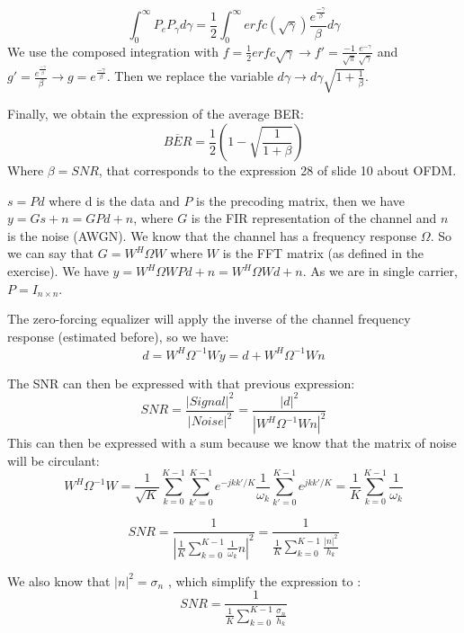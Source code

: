 
\begin{solution}
	$$\int_0^\infty P_e P_\gamma d\gamma = \frac{1}{2} \int_0^\infty erfc(\sqrt{\gamma}) \frac{e^{\frac{-\gamma}{\beta}}}{\beta} d\gamma$$
	We use the composed integration with $f = \frac{1}{2}erfc{\sqrt{\gamma}} \rightarrow f' = \frac{-1}{\sqrt{\pi}}\frac{e^{-\gamma}}{\sqrt{\gamma}}$ and $g' = \frac{e^{\frac{-\gamma}{\beta}}}{\beta} \rightarrow g = e^{\frac{-\gamma}{\beta}}$.
	Then we replace the variable $d\gamma \rightarrow d\gamma \sqrt{1 + \frac{1}{\beta}}$. 
	
	Finally, we obtain the expression of the average BER:
	$$\overline{BER} = \frac{1}{2}(1 - \sqrt{\frac{1}{1 + \beta}})$$
	Where $\beta = SNR$, that corresponds to the expression 28 of slide 10 about OFDM.
\end{solution}

\begin{solution}
	$s = P d$ where d is the data and $P$ is the precoding matrix, then we have $y = Gs + n = GPd + n$, where $G$ is the FIR representation of the channel and $n$ is the noise (AWGN).
	We know that the channel has a frequency response $\Omega$. So we can say that $G = W^H \Omega W$ where $W$ is the FFT matrix (as defined in the exercise).
	We have $y = W^H \Omega W P d + n = W^H \Omega W d + n$. As we are in single carrier, $P = I_{n \times n}$.
	
	The zero-forcing equalizer will apply the inverse of the channel frequency response (estimated before), so we have:
	$$\hat{d} = W^H \Omega^{-1} W y = d + W^H \Omega^{-1}W n$$
	
	The SNR can then be expressed with that previous expression:
	$$SNR = \frac{|Signal|^2}{|Noise|^2} = \frac{|d|^2}{|W^H \Omega^{-1}W n|^2}$$
	This can then be expressed with a sum because we know that the matrix of noise will be circulant: 
	$$W^H \Omega^{-1}W = \frac{1}{\sqrt{K}}\sum^{K-1}_{k = 0} \sum^{K-1}_{k' = 0} e^{-jkk'/K} \frac{1}{\omega_k} \sum^{K-1}_{k' = 0} e^{jkk'/K} = \frac{1}{K} \sum^{K-1}_{k = 0} \frac{1}{\omega_k}$$
	
	$$
	SNR = \frac{1}{| \frac{1}{K} \sum^{K-1}_{k = 0} \frac{1}{\omega_k}n|^2} = \frac{1}{\frac{1}{K} \sum^{K-1}_{k = 0} \frac{|n|^2}{h_k}}
	$$
	
	We also know that $|n|^2 = \sigma_n$	, which simplify the expression to :
	$$SNR = \frac{1}{\frac{1}{K} \sum^{K-1}_{k = 0} \frac{\sigma_n}{h_k}}$$
\end{solution}